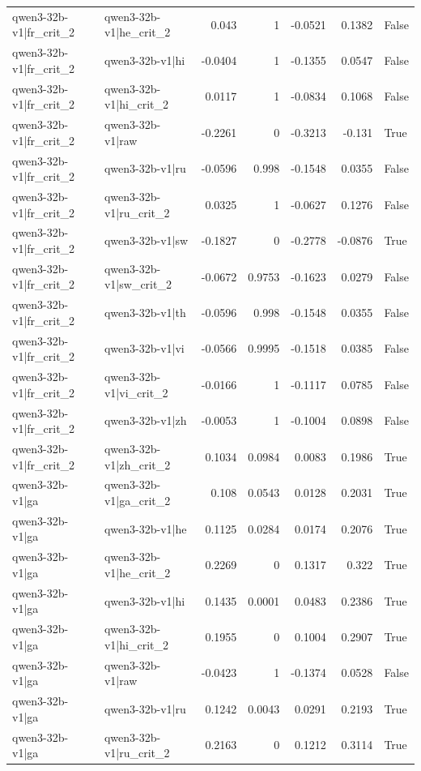 \begin{table}
\begin{tabular}{l l r r r r l}
qwen3-32b-v1|fr_crit_2 & qwen3-32b-v1|he_crit_2 & 0.043 & 1 & -0.0521 & 0.1382 & False \\
qwen3-32b-v1|fr_crit_2 & qwen3-32b-v1|hi & -0.0404 & 1 & -0.1355 & 0.0547 & False \\
qwen3-32b-v1|fr_crit_2 & qwen3-32b-v1|hi_crit_2 & 0.0117 & 1 & -0.0834 & 0.1068 & False \\
qwen3-32b-v1|fr_crit_2 & qwen3-32b-v1|raw & -0.2261 & 0 & -0.3213 & -0.131 & True \\
qwen3-32b-v1|fr_crit_2 & qwen3-32b-v1|ru & -0.0596 & 0.998 & -0.1548 & 0.0355 & False \\
qwen3-32b-v1|fr_crit_2 & qwen3-32b-v1|ru_crit_2 & 0.0325 & 1 & -0.0627 & 0.1276 & False \\
qwen3-32b-v1|fr_crit_2 & qwen3-32b-v1|sw & -0.1827 & 0 & -0.2778 & -0.0876 & True \\
qwen3-32b-v1|fr_crit_2 & qwen3-32b-v1|sw_crit_2 & -0.0672 & 0.9753 & -0.1623 & 0.0279 & False \\
qwen3-32b-v1|fr_crit_2 & qwen3-32b-v1|th & -0.0596 & 0.998 & -0.1548 & 0.0355 & False \\
qwen3-32b-v1|fr_crit_2 & qwen3-32b-v1|vi & -0.0566 & 0.9995 & -0.1518 & 0.0385 & False \\
qwen3-32b-v1|fr_crit_2 & qwen3-32b-v1|vi_crit_2 & -0.0166 & 1 & -0.1117 & 0.0785 & False \\
qwen3-32b-v1|fr_crit_2 & qwen3-32b-v1|zh & -0.0053 & 1 & -0.1004 & 0.0898 & False \\
qwen3-32b-v1|fr_crit_2 & qwen3-32b-v1|zh_crit_2 & 0.1034 & 0.0984 & 0.0083 & 0.1986 & True \\
qwen3-32b-v1|ga & qwen3-32b-v1|ga_crit_2 & 0.108 & 0.0543 & 0.0128 & 0.2031 & True \\
qwen3-32b-v1|ga & qwen3-32b-v1|he & 0.1125 & 0.0284 & 0.0174 & 0.2076 & True \\
qwen3-32b-v1|ga & qwen3-32b-v1|he_crit_2 & 0.2269 & 0 & 0.1317 & 0.322 & True \\
qwen3-32b-v1|ga & qwen3-32b-v1|hi & 0.1435 & 0.0001 & 0.0483 & 0.2386 & True \\
qwen3-32b-v1|ga & qwen3-32b-v1|hi_crit_2 & 0.1955 & 0 & 0.1004 & 0.2907 & True \\
qwen3-32b-v1|ga & qwen3-32b-v1|raw & -0.0423 & 1 & -0.1374 & 0.0528 & False \\
qwen3-32b-v1|ga & qwen3-32b-v1|ru & 0.1242 & 0.0043 & 0.0291 & 0.2193 & True \\
qwen3-32b-v1|ga & qwen3-32b-v1|ru_crit_2 & 0.2163 & 0 & 0.1212 & 0.3114 & True \\

\end{tabular}
\end{table}
